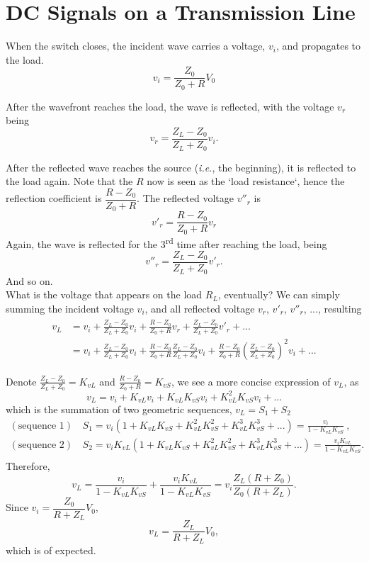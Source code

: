 \documentclass[12pt,a4paper]{article}
\begin{document}
\section{DC Signals on a Transmission Line}
When the switch closes, the incident wave carries a voltage, $v_i$, and propagates to the load.
\[
    v_i = \frac{Z_0}{Z_0+R} V_0
\]

After the wavefront reaches the load, the wave is reflected, with the voltage $v_r$ being 
\[
    v_r = \frac{Z_L-Z_0}{Z_L+Z_0} v_i.
\]

After the reflected wave reaches the source (\textit{i.e.}, the beginning), it is reflected to the load again. Note that the $R$ now is seen as the `load resistance`, hence the reflection coefficient is $\dfrac{R-Z_0}{Z_0+R}$. The reflected voltage $v''_r$ is
\[
    v'_r = \frac{R-Z_0}{Z_0+R} v_r 
\]
Again, the wave is reflected for the 3\textsuperscript{rd} time after reaching the load, being
\[
    v''_r = \frac{Z_L-Z_0}{Z_L+Z_0} v'_r.
\]
And so on. \\

What is the voltage that appears on the load $R_L$, eventually? We can simply summing the incident voltage $v_i$, and all reflected voltage $v_r$, $v'_r$, $v''_r$, ..., resulting
\begin{align}
\begin{split}
    v_L 
    &= v_i + \frac{Z_L-Z_0}{Z_L+Z_0} v_i + \frac{R-Z_0}{Z_0+R} v_r + \frac{Z_L-Z_0}{Z_L+Z_0} v'_r + ... \\
    &= v_i + \frac{Z_L-Z_0}{Z_L+Z_0} v_i + \frac{R-Z_0}{Z_0+R}\frac{Z_L-Z_0}{Z_L+Z_0} v_i + \frac{R-Z_0}{Z_0+R} \left(\frac{Z_L-Z_0}{Z_L+Z_0}\right)^2 v_i + ...
\end{split}
\end{align}

Denote $\frac{Z_L-Z_0}{Z_L+Z_0} = K_{vL}$ and $\frac{R-Z_0}{Z_0+R} = K_{vS}$, we see a more concise expression of $v_L$, as 
\begin{equation}
    v_L = v_i + K_{vL} v_i + K_{vL}K_{vS} v_i + K_{vL}^2 K_{vS} v_i + ...
\end{equation}
which is the summation of two geometric sequences, $v_L = S_1 + S_2$
\begin{align}
    (\text{sequence 1}) &\quad
    S_1 = v_i (1 + K_{vL} K_{vS} + K_{vL}^2 K_{vS}^2 + K_{vL}^3 K_{vS}^3 + ...) = \frac{v_i}{1-K_{vL}K_{vS}} \ ,\\
    (\text{sequence 2}) &\quad
    S_2 = v_i  K_{vL} (1 + K_{vL} K_{vS} +  K_{vL}^2 K_{vS}^2 + K_{vL}^3 K_{vS}^3 + ...) = \frac{v_i  K_{vL}}{1-K_{vL}K_{vS}} .\\
\end{align}
Therefore,
\begin{equation}
    v_L = \frac{v_i}{1-K_{vL}K_{vS}} + \frac{v_i K_{vL}}{1-K_{vL}K_{vS}} = v_i \frac{Z_L (R+Z_0)}{Z_0 (R+Z_L)}.
\end{equation}
Since $v_i = \dfrac{Z_0}{R+Z_L} V_0$,
\begin{equation}
    v_L = \frac{Z_L}{R+Z_L} V_0,
\end{equation}
which is of expected.
\end{document}
